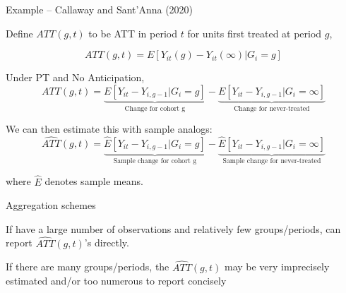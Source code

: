 \documentclass[aspectratio = 169, 13pt]{beamer}
\begin{document}
\begin{frame}{Example -- Callaway and Sant'Anna (2020)}
  \begin{wideitemize}
    \item
    Define $ATT(g,t)$ to be ATT in period $t$ for units first treated at period $g$,

    $$ATT(g,t) = E[ Y_{it}(g) - Y_{it}(\infty) | G_i = g] $$
    
    \pause
    \vspace{-3mm}
    \item
    Under PT and No Anticipation,
    $$ATT(g,t) = \underbrace{E[ Y_{it} - Y_{i,g-1}| G_i = g]}_{\text{Change for cohort g}} -  \underbrace{E[ Y_{it} - Y_{i,g-1}| G_i = \infty]}_{\text{Change for never-treated}} $$
    
    \pause
    \vspace{-3mm}
    \item
    We can then estimate this with sample analogs:
    $$\widehat{ATT}(g,t)= \underbrace{\widehat{E}[ Y_{it} - Y_{i,g-1} | G_i = g]}_{\text{Sample change for cohort g}} -  \underbrace{\widehat{E}[ Y_{it} - Y_{i,g-1} | G_i = \infty]}_{\text{Sample change for never-treated}} $$
    
    \vspace{-3mm}
    where $\hat{E}$ denotes sample means.

  \end{wideitemize}
\end{frame}

\begin{frame}{Aggregation schemes}
  \begin{wideitemize}
    \item
    If have a large number of observations and relatively few groups/periods, can report $\widehat{ATT}(g,t)$'s directly.

    \item
    If there are many groups/periods, the $\widehat{ATT}(g,t)$ may be very imprecisely estimated and/or too numerous to report concisely

  \end{wideitemize}
\end{frame}
\end{document}
